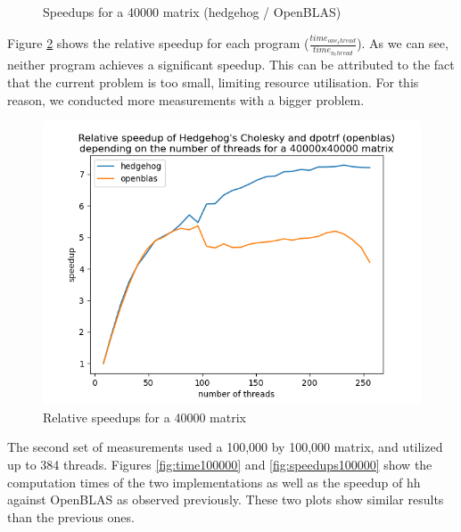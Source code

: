 \begin{figure}[!htb]
\begin{minipage}{0.48\linewidth}
    \caption{Speedups for a 40000 matrix (hedgehog / OpenBLAS)}
    \label{fig:speedups40000}
  \end{minipage}
\end{figure}

Figure \ref{fig:relativespeedup40000} shows the relative speedup for each
program ($\frac{time_{one_thread}}{time_{n_thread}}$). As we can see, neither
program achieves a significant speedup. This can be attributed to the fact that
the current problem is too small, limiting resource utilisation. For this
reason, we conducted more measurements with a bigger problem.

\begin{figure}[!ht]
  \begin{center}
    \includegraphics[scale=0.8]{img/cho-img/relative-speedup-40000.png}
    \caption{Relative speedups for a 40000 matrix}
    \label{fig:relativespeedup40000}
  \end{center}
\end{figure}

The second set of measurements used a 100,000 by 100,000 matrix, and utilized up
to 384 threads. Figures \ref{fig:time100000} and \ref{fig:speedups100000} show
the computation times of the two implementations as well as the speedup of
\gls{hh} against OpenBLAS as observed previously. These two plots show similar
results than the previous ones.

